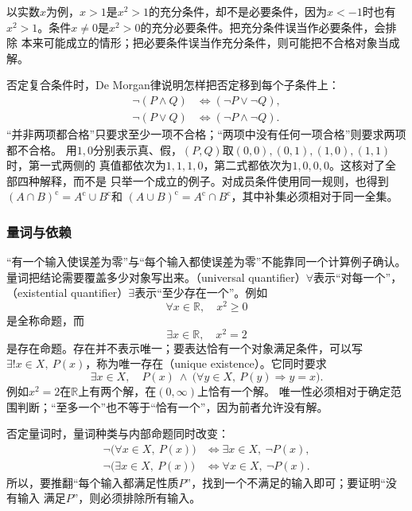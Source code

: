以实数$x$为例，$x>1$是$x^2>1$的充分条件，却不是必要条件，因为$x<-1$时也有
$x^2>1$。条件$x\neq0$是$x^2>0$的充分必要条件。把充分条件误当作必要条件，会排除
本来可能成立的情形；把必要条件误当作充分条件，则可能把不合格对象当成解。

否定复合条件时，De Morgan律说明怎样把否定移到每个子条件上：
\begin{equation}
  \begin{aligned}
    \neg(P\land Q)&\Longleftrightarrow(\neg P\lor\neg Q),\\
    \neg(P\lor Q)&\Longleftrightarrow(\neg P\land\neg Q).
  \end{aligned}
  \label{eq:comb-de-morgan}
\end{equation}
“并非两项都合格”只要求至少一项不合格；“两项中没有任何一项合格”则要求两项都不合格。
用$1,0$分别表示真、假，$(P,Q)$取$(0,0),(0,1),(1,0),(1,1)$时，第一式两侧的
真值都依次为$1,1,1,0$，第二式都依次为$1,0,0,0$。这核对了全部四种解释，而不是
只举一个成立的例子。对成员条件使用同一规则，也得到
$(A\cap B)^{\mathrm c}=A^{\mathrm c}\cup B^{\mathrm c}$和
$(A\cup B)^{\mathrm c}=A^{\mathrm c}\cap B^{\mathrm c}$，其中补集必须相对于同一全集。

\subsubsection{量词与依赖}
\label{sec:prelim-quantifier-dependence}

“有一个输入使误差为零”与“每个输入都使误差为零”不能靠同一个计算例子确认。
量词把结论需要覆盖多少对象写出来。（universal quantifier）$\forall$表示“对每一个”，
（existential quantifier）$\exists$表示“至少存在一个”。例如
\[
  \forall x\in\mathbb{R},\quad x^2\geq0
\]
是全称命题，而
\[
  \exists x\in\mathbb{R},\quad x^2=2
\]
是存在命题。存在并不表示唯一；要表达恰有一个对象满足条件，可以写
$\exists!x\in X,\ P(x)$，称为唯一存在（unique existence）。它同时要求
\[
  \exists x\in X,\quad
  P(x)\ \land\
  \bigl(\forall y\in X,\ P(y)\Rightarrow y=x\bigr).
\]
例如$x^2=2$在$\mathbb{R}$上有两个解，在$(0,\infty)$上恰有一个解。
唯一性必须相对于确定范围判断；“至多一个”也不等于“恰有一个”，因为前者允许没有解。

否定量词时，量词种类与内部命题同时改变：
\begin{align*}
  \neg\bigl(\forall x\in X,\ P(x)\bigr)
  &\Longleftrightarrow
  \exists x\in X,\ \neg P(x),\\
  \neg\bigl(\exists x\in X,\ P(x)\bigr)
  &\Longleftrightarrow
  \forall x\in X,\ \neg P(x).
\end{align*}
所以，要推翻“每个输入都满足性质$P$”，找到一个不满足的输入即可；要证明“没有输入
满足$P$”，则必须排除所有输入。


